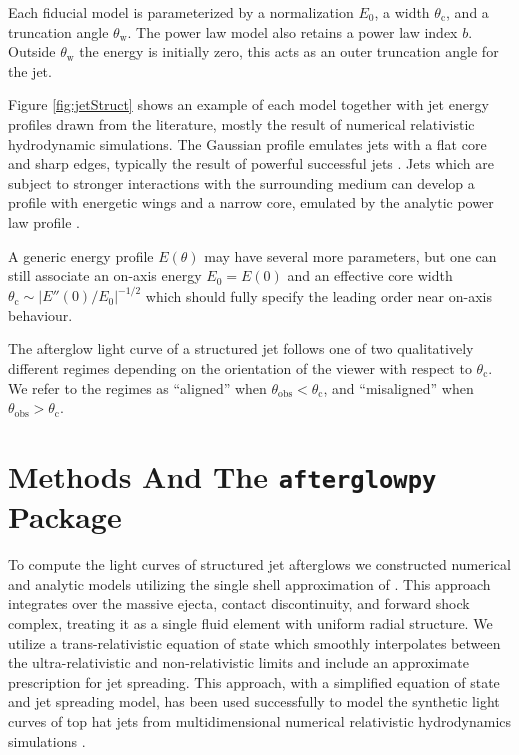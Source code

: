 \documentclass[twocolumn]{aastex62}
\newcommand{\afterglowpy}{{\tt afterglowpy}}
\newcommand{\thobs}{\ensuremath{\theta_{\mathrm{obs}}}}
\newcommand{\thW}{\ensuremath{\theta_{\mathrm{w}}}}
\newcommand{\thC}{\ensuremath{\theta_{\mathrm{c}}}}
\begin{document}
Each fiducial model is parameterized by a normalization $E_0$, a width $\thC$, and a truncation angle $\thW$.  The power law model also retains a power law index $b$.  Outside $\thW$ the energy is initially zero, this acts as an outer truncation angle for the jet.   

Figure \ref{fig:jetStruct} shows an example of each model together with jet energy profiles drawn from the literature, mostly the result of numerical relativistic hydrodynamic simulations.  The Gaussian profile emulates jets with a flat core and sharp edges, typically the result of powerful successful jets \citep{Aloy:2005aa, Margutti:2018aa}.  Jets which are subject to stronger interactions with the surrounding medium can develop a profile with energetic wings and a narrow core, emulated by the analytic power law profile \citep{Mizuta:2009aa, Duffell:2013aa, Lazzati:2017aa}.  

A generic energy profile $E(\theta)$ may have several more parameters, but one can still associate an on-axis energy $E_0 = E(0)$ and an effective core width $\thC \sim |E''(0)/E_0|^{-1/2}$ which should fully specify the leading order near on-axis behaviour.  

The afterglow light curve of a structured jet follows one of two qualitatively different regimes depending on the orientation of the viewer with respect to $\thC$.  We refer to the regimes as ``aligned'' when $\thobs < \thC$, and ``misaligned'' when $\thobs > \thC$.  


\section{Methods And The \afterglowpy{} Package}\label{sec:numerical}

To compute the light curves of structured jet afterglows we constructed numerical and analytic models utilizing the single shell approximation of \cite{van-Eerten:2010aa, van-Eerten:2018ab}.  This approach integrates over the massive ejecta, contact discontinuity, and forward shock complex, treating it as a single fluid element with uniform radial structure. We utilize a trans-relativistic equation of state which smoothly interpolates between the ultra-relativistic and non-relativistic limits and include an approximate prescription for jet spreading.  This approach, with a simplified equation of state and jet spreading model, has been used successfully to model the synthetic light curves of top hat jets from multidimensional numerical relativistic hydrodynamics simulations \citep{van-Eerten:2010aa}.
\end{document}
